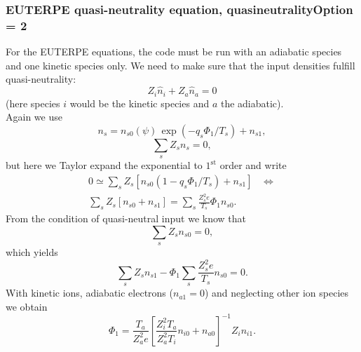 \documentclass[12pt]{article}
\begin{document}
\subsubsection*{EUTERPE quasi-neutrality equation, quasineutralityOption = 2}
For the EUTERPE equations, the code must be run with 
an adiabatic species and one kinetic species only. 
We need to make sure that the input densities fulfill quasi-neutrality:
\begin{equation}
  \label{eq:QuasiNeutralityInputFull}
   Z_i \hat{n}_{i} + Z_a \hat{n}_{a} = 0
\end{equation}
(here species $i$ would be the kinetic species and $a$ the adiabatic).\\
Again we use 
\begin{equation}
n_s = n_{s 0} \left(\psi\right) \, \exp \left(- q_s \Phi_1 / T_s \right) + n_{s 1},
\label{eq:DensityParts2}
\end{equation}
\begin{equation}
\sum_s Z_s n_s = 0,
\label{eq:Quasineutrality2}
\end{equation}
but here we Taylor expand the exponential to $1^{\mathrm{st}}$ order and write
\begin{multline}
\label{eq:QuasineutralityExpanded}
0 \simeq \sum_s Z_s \left[n_{s 0} \left(1 - q_s \Phi_1 / T_s \right) + n_{s 1}\right] \;\;\; \Leftrightarrow \\
\sum_s Z_s \left[n_{s 0} + n_{s 1}\right] = \sum_s \frac{Z_s^2 e}{T_s} \Phi_1 n_{s 0} .
\end{multline}
From the condition of quasi-neutral input we know that
\[
\sum_s Z_s n_{s 0} = 0,
\]
which yields 
\begin{equation}
\sum_s Z_s n_{s 1} - \Phi_1 \sum_s \frac{Z_s^2 e}{T_s} n_{s 0}  = 0.
\label{eq:Quasineutrality2}
\end{equation}
With kinetic ions, adiabatic electrons ($n_{a 1} = 0$) and neglecting other ion species we obtain 
\begin{equation}
\Phi_1 = \frac{T_a}{Z_a^2 e} \left[\frac{Z_i^2 T_a}{Z_a^2 T_i} n_{i 0} + n_{a 0}\right]^{-1} Z_i n_{i 1}.
\label{eq:Phi1}
\end{equation}
%
\end{document}
